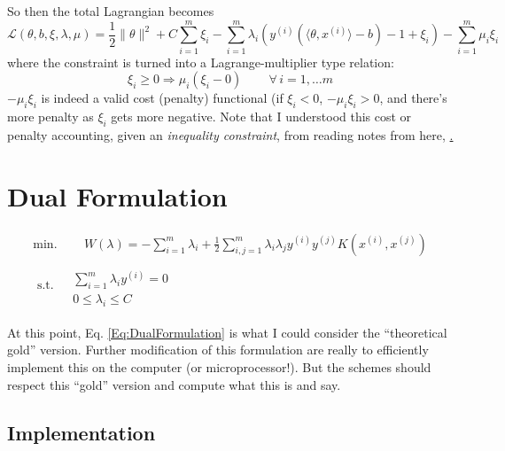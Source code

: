 \documentclass[10pt]{amsart}
\begin{document}
\begin{multicols*}{2}
So then the total Lagrangian becomes
\begin{equation}
  \mathcal{L}(\theta,b,\xi,\lambda,\mu) = \frac{1}{2} \| \theta \|^2 + C\sum_{i=1}^m \xi_i - \sum_{i=1}^m \lambda_i (y^{(i)}(\langle \theta,x^{(i)} \rangle -b)-1 +\xi_i ) - \sum_{i=1}^m \mu_i \xi_i
\end{equation}
where the constraint is turned into a Lagrange-multiplier type relation:
\begin{equation}
\xi_i \geq 0 \Longrightarrow \mu_i(\xi_i - 0) \qquad \, \forall \, i =1,\dots m 
\end{equation}
$-\mu_i\xi_i$ is indeed a valid cost (penalty) functional (if $\xi_i  <0$, $-\mu_i\xi_i >0$, and there's more penalty as $\xi_i$ gets more negative.  Note that I understood this cost or penalty accounting, given an \emph{inequality constraint}, from reading notes from here, \href{http://www.pitt.edu/~jrclass/opt/notes4.pdf}.   








\section{Dual Formulation}

\begin{equation}\label{Eq:DualFormulation}
\begin{gathered}
  \text{min}. \qquad \, W(\lambda) = -\sum_{i=1}^m \lambda_i +\frac{1}{2} \sum_{i,j=1}^m \lambda_i \lambda_j y^{(i)} y^{(j)} K(x^{(i)},x^{(j)}) \\
  \text{ s.t. } \begin{aligned} & \quad \\
    & \sum_{i=1}^m \lambda_i y^{(i)} = 0  \\
    & 0 \leq \lambda_i \leq C \end{aligned}
  \end{gathered}
  \end{equation}

At this point, Eq. \ref{Eq:DualFormulation} is what I could consider the ``theoretical gold'' version.  Further modification of this formulation are really to efficiently implement this on the computer (or microprocessor!).  But the schemes should respect this ``gold'' version and compute what this is and say.  

\subsection{Implementation}


\end{multicols*}
\end{document}
